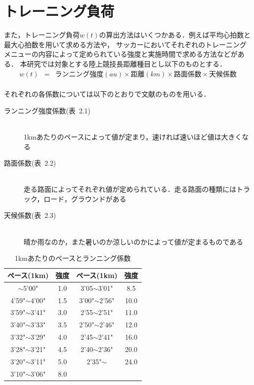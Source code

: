 \documentclass[12pt,fleqn]{jreport}
\begin{document}
\section{トレーニング負荷}
また，トレーニング負荷$w(t)$の算出方法はいくつかある．例えば平均心拍数と最大心拍数を用いて求める方法や，
サッカーにおいてそれぞれのトレーニングメニューの内容によって定められている強度と実施時間で求める方法などがある\cite{fitfig1}．
本研究では対象とする陸上競技長距離種目とし以下のものとする．\\
\begin{eqnarray}
  w(t)&=&ランニング強度(au)\times 距離(km)\times 路面係数\times 天候係数\label{eq:w1}%
\end{eqnarray}\\
それぞれの各係数については以下のとおりで文献\cite{fitfig1}のものを用いる．
\begin{description}
  \item[ランニング強度係数(表\ 2.1)] 　\\
        1kmあたりのペースによって値が定まり，速ければ速いほど値は大きくなる
  \item[路面係数(表\ 2.2)] 　\\
        走る路面によってそれぞれ値が定められている．走る路面の種類にはトラック，ロード，グラウンドがある
  \item[天候係数(表\ 2.3)] 　\\
        晴か雨なのか，また暑いのか涼しいのかによって値が定まるものである
\end{description}
\vspace{1cm}
\begin{longtable}{|c|c|c|c|}
  \caption{1kmあたりのペースとランニング係数}       \\
  \hline
  ペース(1km)      & 強度 & ペース(1km)      & 強度 \\
  \hline
  $\sim$5'00"      & 1.0  & 3'05$\sim$3'01"  & 8.5  \\
  \hline
  4'59"$\sim$4'00" & 1.5  & 3'00"$\sim$2'56" & 10.0 \\
  \hline
  3'59"$\sim$3'41" & 3.0  & 2'55$\sim$2'51"  & 11.0 \\
  \hline
  3'40"$\sim$3'33" & 3.5  & 2'50"$\sim$2'46" & 12.0 \\
  \hline
  3'32"$\sim$3'29" & 4.0  & 2'45$\sim$2'41"  & 16.0 \\
  \hline
  3'28"$\sim$3'21" & 4.5  & 2'40$\sim$2'36"  & 20.0 \\
  \hline
  3'20"$\sim$3'11" & 5.0  & 2'35"$\sim$      & 24.0 \\
  \hline
  3'10"$\sim$3'06" & 8.0  &                  &      \\
  \hline
\end{longtable}
\end{document}
